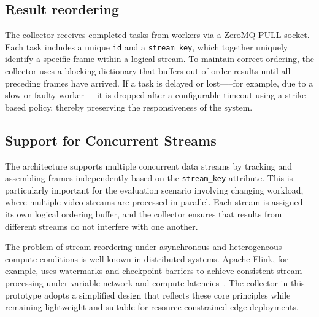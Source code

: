 \subsection{Result reordering}
The collector receives completed tasks from workers via a ZeroMQ PULL socket. Each task includes a unique \texttt{id} and a \texttt{stream\_key}, which together uniquely identify a specific frame within a logical stream. To maintain correct ordering, the collector uses a blocking dictionary that buffers out-of-order results until all preceding frames have arrived. If a task is delayed or lost—--for example, due to a slow or faulty worker—--it is dropped after a configurable timeout using a strike-based policy, thereby preserving the responsiveness of the system.

\subsection{Support for Concurrent Streams}
The architecture supports multiple concurrent data streams by tracking and assembling frames independently based on the \texttt{stream\_key} attribute. This is particularly important for the evaluation scenario involving changing workload, where multiple video streams are processed in parallel. Each stream is assigned its own logical ordering buffer, and the collector ensures that results from different streams do not interfere with one another.

The problem of stream reordering under asynchronous and heterogeneous compute conditions is well known in distributed systems. Apache Flink, for example, uses watermarks and checkpoint barriers to achieve consistent stream processing under variable network and compute latencies~\cite{carbone_apache_2015}. The collector in this prototype adopts a simplified design that reflects these core principles while remaining lightweight and suitable for resource-constrained edge deployments.